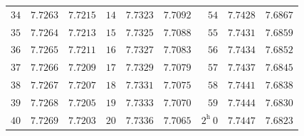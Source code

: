 \begin{center}
{{\begin{minipage}{.83\linewidth}
\begin{tabular}{r|r|r||r|r|r||r|r|r}
$34$ & $7.7263$ & $7.7215$ & $14$ & $7.7323$ & $7.7092$ & $54$ & $7.7428$ & $7.6867$\\
$35$ & $7.7264$ & $7.7213$ & $15$ & $7.7325$ & $7.7088$ & $55$ & $7.7431$ & $7.6859$\\[1.15pt]
$36$ & $7.7265$ & $7.7211$ & $16$ & $7.7327$ & $7.7083$ & $56$ & $7.7434$ & $7.6852$\\
$37$ & $7.7266$ & $7.7209$ & $17$ & $7.7329$ & $7.7079$ & $57$ & $7.7437$ & $7.6845$\\
$38$ & $7.7267$ & $7.7207$ & $18$ & $7.7331$ & $7.7075$ & $58$ & $7.7441$ & $7.6838$\\
$39$ & $7.7268$ & $7.7205$ & $19$ & $7.7333$ & $7.7070$ & $59$ & $7.7444$ & $7.6830$\\
$40$ & $7.7269$ & $7.7203$ & $20$ & $7.7336$ & $7.7065$ & $2^{\mathrm h}\ 0$ & $7.7447$ & $7.6823$\\
\end{tabular}
\endgroup
\end{minipage}}}\endgroup
\end{center}
\clearpage{}%
